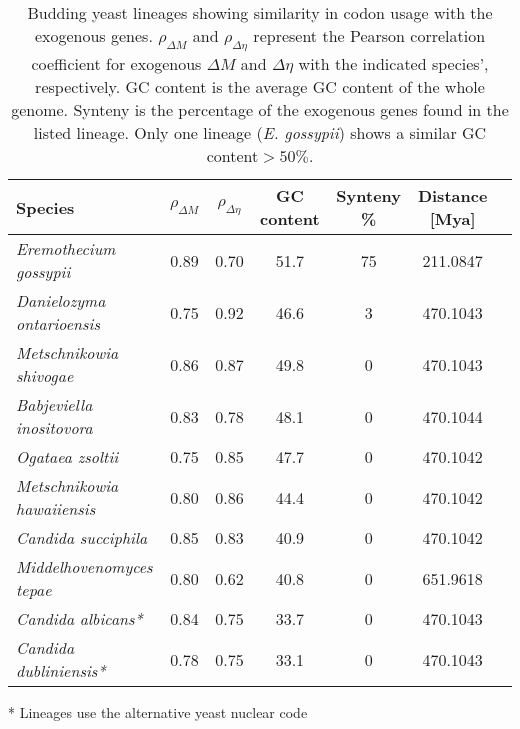 \documentclass[doublespacing,linenumbers]{bmcart}
\newcommand{\gossypii}{\textit{E. gossypii}\xspace}
\newcommand{\GC}{GC content\xspace}
\newcommand{\DM}{\ensuremath{{\Delta M}}\xspace}
\newcommand{\DE}{\ensuremath{{\Delta \eta}}\xspace}
\begin{document}
\begin{table}
  \centering
  \caption{Budding yeast lineages showing similarity in codon usage with the exogenous genes.
  $\rho_\DM$ and $\rho_\DE$ represent the Pearson correlation coefficient for exogenous \DM and \DE with the indicated species', respectively.
  \GC is the average \GC of the whole genome.
  Synteny is the percentage of the exogenous genes found in the listed lineage.
  Only one lineage (\gossypii) shows a similar \GC $> 50 \%$.}
  \begin{threeparttable}
  	\begin{tabular}{lcccccc}
    		\hline
    		Species & $\rho_\DM$ & $\rho_\DE$ & \GC & Synteny \%&  Distance [Mya] \\ \hline 
    		\emph{Eremothecium gossypii}			& 0.89 & 0.70 & 51.7 & 75 & 211.0847 \\
    		\emph{Danielozyma ontarioensis}			& 0.75 & 0.92 & 46.6 & 3   & 470.1043 \\
    		\emph{Metschnikowia shivogae}			& 0.86 & 0.87 & 49.8 & 0   & 470.1043 \\
    		\emph{Babjeviella inositovora}			& 0.83 & 0.78 & 48.1 & 0   & 470.1044 \\
    		\emph{Ogataea zsoltii}					& 0.75 & 0.85 & 47.7 & 0   & 470.1042 \\ 
    		\emph{Metschnikowia hawaiiensis}		& 0.80 & 0.86 & 44.4 & 0   & 470.1042 \\
    		\emph{Candida succiphila}	       			& 0.85 & 0.83 & 40.9 & 0   & 470.1042 \\ 
    		\emph{Middelhovenomyces tepae}		& 0.80 & 0.62 & 40.8 & 0   & 651.9618 \\ 
    		\emph{Candida albicans*}		   		& 0.84 & 0.75 & 33.7 & 0   & 470.1043 \\
   		\emph{Candida dubliniensis*}               		& 0.78 & 0.75 & 33.1 & 0   & 470.1043 \\ \hline
  	\end{tabular}
  	\begin{tablenotes}
    		\item[*] Lineages use the alternative yeast nuclear code %
 	 \end{tablenotes}
  \end{threeparttable}  
  \label{tab:source}
\end{table}
\end{document}
